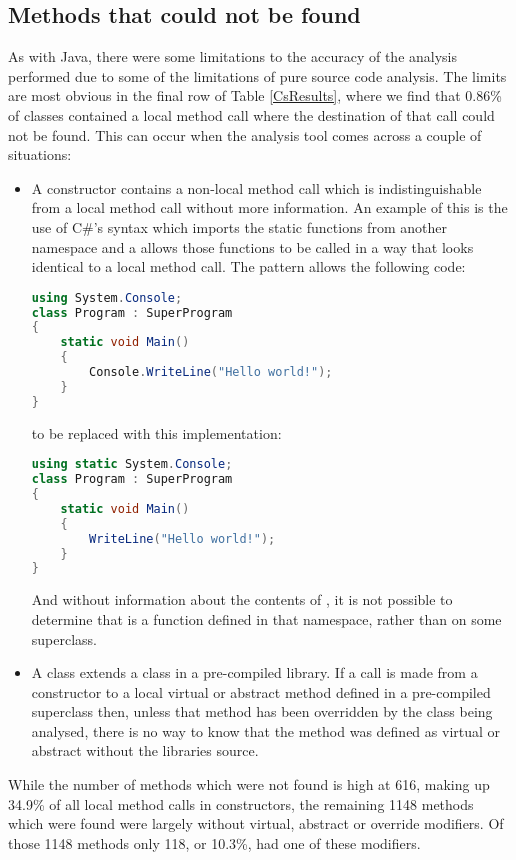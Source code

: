 \subsection{Methods that could not be found}
\label{MethodNotFound}
As with Java, there were some limitations to the accuracy of the analysis performed due to some of the limitations of pure source code analysis. The limits are most obvious in the final row of Table \ref{CsResults}, where we find that 0.86\% of classes contained a local method call where the destination of that call could not be found. This can occur when the analysis tool comes across a couple of situations:
\begin{itemize}
	\item A constructor contains a non-local method call which is indistinguishable from a local method call without more information. An example of this is the use of C\#'s  syntax which imports the static functions from another namespace and a allows those functions to be called in a way that looks identical to a local method call. The  pattern allows the following code:
	\begin{lstlisting}[language=cs]
using System.Console;
class Program : SuperProgram
{ 
	static void Main() 
	{ 
		Console.WriteLine("Hello world!"); 
	} 
}
	\end{lstlisting}
	to be replaced with this implementation:
	\begin{lstlisting}[language=cs]
using static System.Console;
class Program : SuperProgram
{ 
	static void Main() 
	{ 
		WriteLine("Hello world!"); 
	} 
}
	\end{lstlisting}
	And without information about the contents of , it is not possible to determine that  is a function defined in that namespace, rather than on some superclass.
	\item A class extends a class in a pre-compiled library. If a call is made from a constructor to a local virtual or abstract method defined in a pre-compiled superclass then, unless that method has been overridden by the class being analysed, there is no way to know that the method was defined as virtual or abstract without the libraries source.
\end{itemize}
While the number of methods which were not found is high at 616, making up 34.9\% of all local method calls in constructors, the remaining 1148 methods which were found were largely without virtual, abstract or override modifiers. Of those 1148 methods only 118, or 10.3\%, had one of these modifiers.

